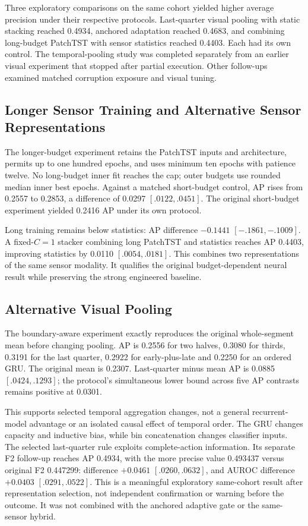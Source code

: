 Three exploratory comparisons on the same cohort yielded higher average precision under
their respective protocols. Last-quarter visual pooling with static stacking reached
0.4934, anchored adaptation reached 0.4683, and combining long-budget PatchTST with
sensor statistics reached 0.4403. Each had its own control. The temporal-pooling study
was completed separately from an earlier visual experiment that stopped after partial
execution. Other follow-ups examined matched corruption exposure and visual
tuning.

\subsection{Longer Sensor Training and Alternative Sensor Representations}
The longer-budget experiment retains the PatchTST inputs and architecture, permits up to
one hundred epochs, and uses minimum ten epochs with patience twelve. No long-budget
inner fit reaches the cap; outer budgets use rounded median inner best epochs. Against a
matched short-budget control, AP rises from 0.2557 to 0.2853, a difference of 0.0297
$[.0122,.0451]$. The original short-budget experiment yielded 0.2416 AP under its own
protocol.

Long training remains below statistics: AP difference $-0.1441$ $[-.1861,-.1009]$. A
fixed-$C=1$ stacker combining long PatchTST and statistics reaches AP 0.4403, improving
statistics by 0.0110 $[.0054,.0181]$. This combines two representations of the same
sensor modality. It qualifies the original budget-dependent neural result while
preserving the strong engineered baseline.

\subsection{Alternative Visual Pooling}
The boundary-aware experiment exactly reproduces the original whole-segment mean before
changing pooling. AP is 0.2556 for two halves, 0.3080 for thirds, 0.3191 for the last
quarter, 0.2922 for early-plus-late and 0.2250 for an ordered GRU. The original mean is
0.2307. Last-quarter minus mean AP is 0.0885 $[.0424,.1293]$; the protocol's
simultaneous lower bound across five AP contrasts remains positive at 0.0301.

This supports selected temporal aggregation changes, not a general recurrent-model
advantage or an isolated causal effect of temporal order. The GRU changes capacity and
inductive bias, while bin concatenation changes classifier inputs. The selected
last-quarter rule exploits complete-action information. Its separate F2 follow-up
reaches AP 0.4934, with the more precise value 0.493437 versus original F2 0.447299:
difference $+0.0461$ $[.0260,.0632]$, and AUROC difference $+0.0403$ $[.0291,.0522]$.
This is a meaningful exploratory same-cohort result after representation selection, not
independent confirmation or warning before the outcome. It was not combined with the
anchored adaptive gate or the same-sensor hybrid.

